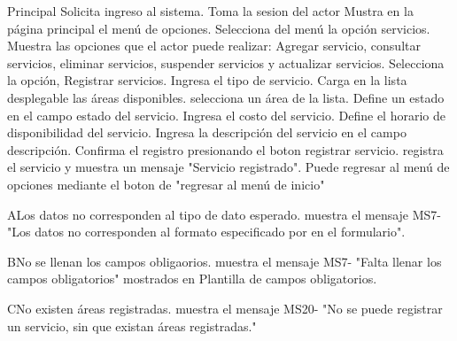 	\begin{UCtrayectoria}{Principal}
		\UCpaso Solicita ingreso al sistema.
		\UCpaso Toma la sesion del actor
		\UCpaso Mustra en la página principal el menú de opciones.
		\UCpaso[\UCactor] Selecciona del menú la opción servicios.
		\UCpaso Muestra las opciones que el actor puede realizar: Agregar servicio, consultar servicios, eliminar servicios, suspender servicios y actualizar servicios.
		\UCpaso[\UCactor] Selecciona la opción, Registrar servicios. 
		\UCpaso[\UCactor] Ingresa el tipo de servicio.
		\UCpaso Carga en la lista desplegable las áreas disponibles. 
		\UCpaso[\UCactor] selecciona un área de la lista.
		\UCpaso[\UCactor] Define un estado en el campo estado del servicio.
		\UCpaso[\UCactor] Ingresa el costo del servicio.
		\UCpaso[\UCactor] Define el horario de disponibilidad del servicio.
		\UCpaso[\UCactor] Ingresa la descripción del servicio en el campo descripción.
		\UCpaso[\UCactor] Confirma el registro presionando el boton registrar servicio.  
		\UCpaso registra el servicio y muestra un mensaje "Servicio registrado".
		\UCpaso[\UCactor] Puede regresar al menú de opciones mediante el boton de "regresar al menú de inicio"

	\end{UCtrayectoria}

		\begin{UCtrayectoriaA}{A}{Los datos no corresponden al tipo de dato esperado.}
		\UCpaso muestra el mensaje MS7- "Los datos no corresponden al formato especificado por en el formulario".
		\end{UCtrayectoriaA}

		\begin{UCtrayectoriaA}{B}{No se llenan los campos obligaorios.}
			\UCpaso muestra el mensaje MS7- "Falta llenar los campos obligatorios" mostrados en Plantilla de campos obligatorios.
		\end{UCtrayectoriaA}

		\begin{UCtrayectoriaA}{C}{No existen áreas registradas.}
			\UCpaso muestra el mensaje MS20- "No se puede registrar un servicio, sin que existan áreas registradas."
		\end{UCtrayectoriaA}
	
